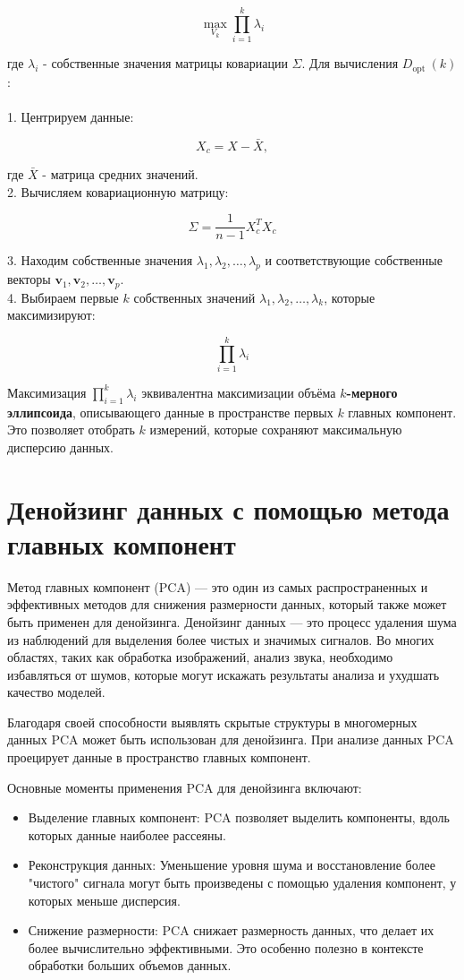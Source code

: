 $$
    \max _{V_k} \prod_{i=1}^k \lambda_i
$$


где $\lambda_i$ - собственные значения матрицы ковариации $\Sigma$.
Для вычисления $D_{\text {opt }}(k)$ :\\
\\
1. Центрируем данные:

$$
    X_c=X-\bar{X},
$$


где $\bar{X}$ - матрица средних значений.\\
2. Вычисляем ковариационную матрицу:

$$
    \Sigma=\frac{1}{n-1} X_c^T X_c
$$

3. Находим собственные значения $\lambda_1, \lambda_2, \ldots, \lambda_p$ и соответствующие собственные векторы $\mathbf{v}_1, \mathbf{v}_2, \ldots, \mathbf{v}_p$.\\
4. Выбираем первые $k$ собственных значений $\lambda_1, \lambda_2, \ldots, \lambda_k$, которые максимизируют:

$$
    \prod_{i=1}^k \lambda_i
$$

Максимизация $\prod_{i=1}^k \lambda_i$ эквивалентна максимизации объёма \textbf{$k$-мерного эллипсоида}, описывающего данные в пространстве первых $k$ главных компонент. Это позволяет отобрать $k$ измерений, которые сохраняют максимальную дисперсию данных.


\section{Денойзинг данных с помощью метода главных компонент}
Метод главных компонент (PCA) — это один из самых распространенных и эффективных методов для снижения размерности данных, который также может быть применен для денойзинга. Денойзинг данных — это процесс удаления шума из наблюдений для выделения более чистых и значимых сигналов. Во многих областях, таких как обработка изображений, анализ звука, необходимо избавляться от шумов, которые могут искажать результаты анализа и ухудшать качество моделей.

Благодаря своей способности выявлять скрытые структуры в многомерных данных PCA может быть использован для денойзинга. При анализе данных PCA проецирует данные в пространство главных компонент.

Основные моменты применения PCA для денойзинга включают:
\begin{itemize}
    \item Выделение главных компонент:
          PCA позволяет выделить компоненты, вдоль которых данные наиболее рассеяны.

    \item Реконструкция данных: Уменьшение уровня шума и восстановление более "чистого" сигнала могут быть произведены с помощью удаления компонент, у которых меньше дисперсия.

    \item Снижение размерности: PCA снижает размерность данных, что делает их более вычислительно эффективными. Это особенно полезно в контексте обработки больших объемов данных.
\end{itemize}

